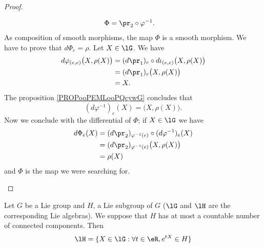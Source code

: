 \begin{theorem}
\begin{proof}
\begin{subproof}
\begin{equation}
\begin{aligned}
				\Phi         & =\pr_2\circ \varphi^{-1}.
			\end{aligned}
		\end{equation}
		As composition of smooth morphisms, the map \( \Phi\) is a smooth morphism. We have to prove that \( d\Phi_e=\rho\).
		Let \( X\in\lG\). We have
		\begin{subequations}
			\begin{align}
				d\varphi_{(e,e)}\big( X,\rho(X) \big) & =(d\pr_1)_e\circ d\iota_{(e,e)}\big( X,\rho(X) \big) \\
				                                      & =(d\pr_1)_e\big( X,\rho(X) \big)                     \\
				                                      & =X.
			\end{align}
		\end{subequations}
		The proposition \ref{PROPooPEMLooPQcywG} concludes that
		\begin{equation}
			(d\varphi^{-1})_e(X)=\big( X,\rho(X) \big).
		\end{equation}
		\spitem[Conclusion]
		Now we conclude with the differential of \( \Phi\); if \( X\in\lG\) we have
		\begin{subequations}
			\begin{align}
				d\Phi_e(X) & =(d\pr_2)_{\varphi^{-1}(e)}\circ (d\varphi^{-1})_e(X) \\
				           & =(d\pr_2)_{\varphi^{-1}(e)}\big( X,\rho(X) \big)      \\
				           & =\rho(X)
			\end{align}
		\end{subequations}
		and \( \Phi\) is the map we were searching for.
	\end{subproof}
\end{proof}


\begin{proposition}     \label{PROPooCRKMooIIbKUM}
	Let $G$ be a Lie group and $H$, a Lie subgroup of $G$ ($\lG$ and $\lH$ are the corresponding Lie algebras). We suppose that $H$ has at most a countable number of connected components. Then
	\begin{equation}
		\lH=\{ X\in\lG:\forall t\in\eR,e^{tX}\in H \}
	\end{equation}
\end{proposition}


\end{theorem}
